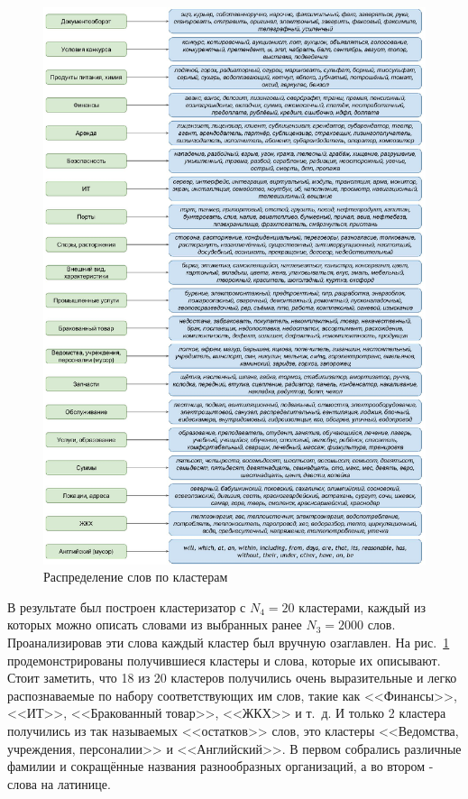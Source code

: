 \documentclass[12pt]{article}
\begin{document}
\begin{center}
	\begin{figure}[h!]
		\centering
		\includegraphics[scale=0.7]{images/im4.eps}
		\caption{Распределение слов по кластерам}
		\label{im4}
	\end{figure}
\end{center}

В результате был построен кластеризатор с $N_4 = 20$ кластерами, каждый из которых можно описать словами из выбранных ранее $N_3 = 2000$ слов. Проанализировав эти слова каждый кластер был вручную озаглавлен. На рис.~\ref{im4} продемонстрированы получившиеся кластеры и слова, которые их описывают. Стоит заметить, что 18 из 20 кластеров получились очень выразительные и легко распознаваемые по набору соответствующих им слов, такие как <<Финансы>>, <<ИТ>>, <<Бракованный товар>>, <<ЖКХ>> и т.~д. И только 2 кластера получились из так называемых <<остатков>> слов, это кластеры <<Ведомства, учреждения, персоналии>> и <<Английский>>. В первом собрались различные фамилии и сокращённые названия разнообразных организаций, а во втором - слова на латинице.
\end{document}
